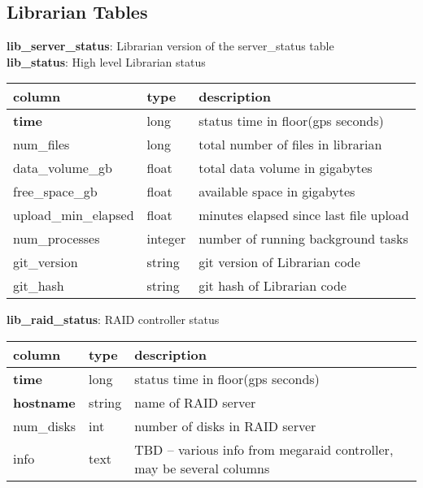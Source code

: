 \documentclass{article}
\begin{document}
\subsection{Librarian Tables}
\textbf{\large{lib\_server\_status}}: Librarian version of the server\_status table\\

\textbf{\large{lib\_status}}: High level Librarian status
\begin{center}
 \begin{tabular}{| p{4cm} | p{2cm} | p{10cm} |} 
\hline
 column & type & description \\ [0.5ex]  \hline\hline
\textbf{time} & long & status time in floor(gps seconds) \\ \hline
num\_files & long & total number of files in librarian  \\\hline
data\_volume\_gb & float & total data volume in gigabytes  \\\hline
free\_space\_gb & float & available space in gigabytes  \\\hline
upload\_min\_elapsed & float & minutes elapsed since last file upload \\\hline
num\_processes & integer & number of running background tasks  \\\hline
git\_version & string & git version of Librarian code  \\\hline
git\_hash & string & git hash of Librarian code  \\\hline
\end{tabular}
\end{center}

\textbf{\large{lib\_raid\_status}}: RAID controller status
\begin{center}
 \begin{tabular}{| p{4cm} | p{2cm} | p{10cm} |} 
\hline
 column & type & description \\ [0.5ex]  \hline\hline
\textbf{time} & long & status time in floor(gps seconds) \\ \hline
\textbf{hostname} & string & name of RAID server \\ \hline
num\_disks & int & number of disks in RAID server  \\\hline
info & text & TBD -- various info from megaraid controller, may be several columns \\\hline
\end{tabular}
\end{center}
\end{document}
